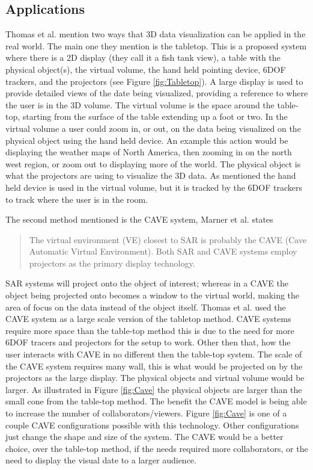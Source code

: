 \documentclass{sig-alternate}
\begin{document}
\subsection{Applications}
\label{sec:3D Applications}
Thomas et al. \cite{3D} mention two ways that 3D data visualization can be applied in the real world. The main one they mention is the tabletop. This is a proposed system where there is a 2D display (they call it a fish tank view), a table with the physical object(s), the virtual volume, the hand held pointing device, 6DOF trackers, and the projectors (see Figure \ref{fig:Tabletop}). A large display is used to provide detailed views of the date being visualized, providing a reference to where the user is in the 3D volume. The virtual volume is the space around the table-top, starting from the surface of the table extending up a foot or two. In the virtual volume a user could zoom in, or out, on the data being visualized on the physical object using the hand held device. An example this action would be displaying the weather maps of North America, then zooming in on the north west region, or zoom out to displaying more of the world. The physical object is what the projectors are using to visualize the 3D data. As mentioned the hand held device is used in the virtual volume, but it is tracked by the 6DOF trackers to track where the user is in the room.

The second method mentioned is the CAVE system, Marner et al. \cite{CAVE} states
\begin{quote}
	The virtual environment (VE) closest to SAR is probably the CAVE (Cave Automatic Virtual Environment). Both SAR and CAVE systems employ projectors as the primary display technology. \cite{CAVE}
\end{quote}
SAR systems will project onto the object of interest; whereas in a CAVE the object being projected onto becomes a window to the virtual world, making the area of focus on the data instead of the object itself. Thomas et al. \cite{3D} used the CAVE system as a large scale version of the tabletop method. CAVE systems require more space than the table-top method this is due to the need for more 6DOF tracers and projectors for the setup to work. Other then that, how the user interacts with CAVE in no different then the table-top system. The scale of the CAVE system requires many wall, this is what would be projected on by the projectors as the large display. The physical objects and virtual volume would be larger. As illustrated in Figure \ref{fig:Cave} the physical objects are larger than the small cone from the table-top method. The benefit the CAVE model is being able to increase the number of collaborators/viewers. Figure \ref{fig:Cave} is one of a couple CAVE configurations possible with this technology. Other configurations just change the shape and size of the system. The CAVE would be a better choice, over the table-top method, if the needs required more collaborators, or the need to display the visual date to a larger audience. 
\end{document}
